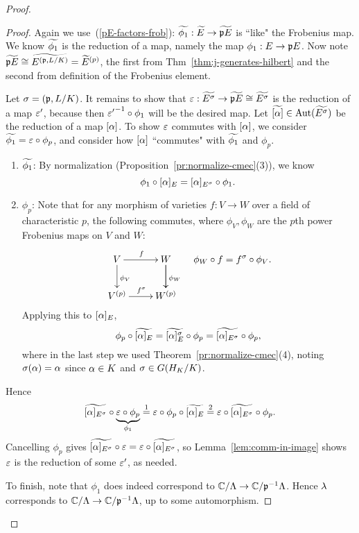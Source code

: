 \begin{proof}
\begin{proof}
Again we use~(\ref{pE-factors-frob}): $\widetilde{\phi_1}:\widetilde{E}\to \widetilde{\mathfrak{p} E}$ is ``like" the Frobenius map. We know $\widetilde{\phi_1}$ is the reduction of a map, namely the map $\phi_1:E\to \mathfrak{p} E$. Now note $\widetilde{\mathfrak{p} E}\cong \widetilde{E^{(\mathfrak{p},L/K)}}=\widetilde{E}^{(p)}$, the first from Thm~\ref{thm:j-generates-hilbert} and the second from definition of the Frobenius element.

Let $\sigma=(\mathfrak{p},L/K)$. It remains to show that $\varepsilon:\widetilde{E^{\sigma}}\to \widetilde{\mathfrak{p} E}\cong \widetilde{E^{\sigma}}$ is the reduction of a map $\varepsilon'$, because then ${\varepsilon'}^{-1}\circ \phi_1$ will be the desired map. Let $\widetilde{[\alpha]}\in \operatorname{Aut}(\widetilde{E^{\sigma}})$ be the reduction of a map $[\alpha]$. 
To show $\varepsilon$ commutes with $[\alpha]$, we consider $\widetilde{\phi_1}=\varepsilon\circ \phi_p$, and consider how $[\alpha]$ ``commutes" with $\widetilde{\phi_1}$ and $\phi_p$.
\begin{enumerate}
\item
$\widetilde{\phi_1}$: By normalization (Proposition~\ref{pr:normalize-cmec}(3)), we know
\[
\phi_1\circ [\alpha]_E=[\alpha]_{E^{\sigma}}\circ \phi_1.
\]
\item
$\phi_p$: Note that for any morphism of varieties $f:V\to W$ over a field of characteristic $p$, the following commutes, where $\phi_V,\phi_W$ are the $p$th power Frobenius maps on $V$ and $W$:
\[
\xymatrix{
V\ar[r]^f \ar[d]^{\phi_V}& W\ar[d]\ar[d]^{\phi_W}\\
V^{(p)}\ar[r]^{f^{\si}} & W^{(p)}
}\quad \phi_W\circ f=f^{\si}\circ \phi_V.
\]
Applying this to $[\alpha]_E$,
\[
\phi_p\circ \widetilde{[\alpha]_E}=\widetilde{[\alpha]_E^{\sigma}}\circ \phi_p=\widetilde{[\alpha]_{E^{\sigma}}}\circ \phi_p,
\]
where in the last step we used Theorem~\ref{pr:normalize-cmec}(4), noting $\sigma(\alpha)=\alpha$ since $\alpha \in K$ and $\sigma\in G(H_K/K)$.
\end{enumerate}
Hence
\[
\widetilde{[\alpha]_{E^{\sigma}}}\circ \underbrace{\varepsilon\circ \phi_p}_{\phi_1}\stackrel{1}=
\varepsilon\circ \phi_p\circ \widetilde{[\alpha]_E}
\stackrel{2}=
\varepsilon\circ \widetilde{[\alpha]_{E^{\sigma}}}\circ \phi_p.
\]
Cancelling $\phi_p$ gives $\widetilde{[\alpha]_{E^{\sigma}}}\circ \varepsilon=\varepsilon\circ \widetilde{[\alpha]_{E^{\sigma}}}$, so Lemma~\ref{lem:comm-in-image} shows $\varepsilon$ is the reduction of some $\varepsilon'$, as needed.

To finish, note that $\phi_1$ does indeed correspond to $\mathbb{C}/\Lambda\to \mathbb{C}/\mathfrak{p}^{-1}\Lambda$. Hence $\lambda$ corresponds to $\mathbb{C}/\Lambda\to \mathbb{C}/\mathfrak{p}^{-1}\Lambda$, up to some automorphism.
\end{proof}


\end{proof}
